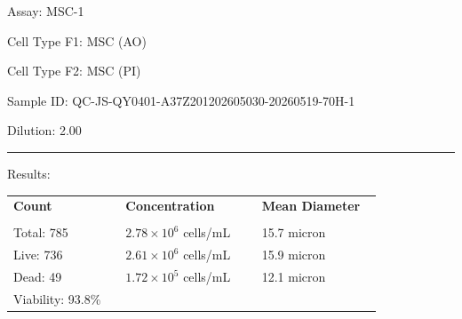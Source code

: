 \documentclass[UTF8,10pt,a4paper,fontset=fandol]{ctexart}
\newcommand{\fieldvalue}[1]{#1}
\begin{document}
\newpage

\noindent
Assay: \fieldvalue{MSC-1}

\medskip
Cell Type F1: \fieldvalue{MSC (AO)}

\noindent
Cell Type F2: \fieldvalue{MSC (PI)}

\medskip
Sample ID: \fieldvalue{QC-JS-QY0401-A37Z201202605030-20260519-70H-1}

\noindent
Dilution: \fieldvalue{2.00}

\bigskip
\noindent\rule{\linewidth}{0.4pt}

\noindent Results:

\medskip
\begin{tabular}{@{}p{0.28\linewidth}p{0.34\linewidth}p{0.30\linewidth}@{}}
\textbf{Count} & \textbf{Concentration} & \textbf{Mean Diameter} \\[-1mm]
\underline{\hspace{0.25\linewidth}} &
\underline{\hspace{0.30\linewidth}} &
\underline{\hspace{0.27\linewidth}} \\[1mm]

Total:
\fieldvalue{785}
&
\fieldvalue{$2.78 \times 10^{6}$ cells/mL}
&
\fieldvalue{15.7 micron}
\\

Live:
\fieldvalue{736}
&
\fieldvalue{$2.61 \times 10^{6}$ cells/mL}
&
\fieldvalue{15.9 micron}
\\

Dead:
\fieldvalue{49}
&
\fieldvalue{$1.72 \times 10^{5}$ cells/mL}
&
\fieldvalue{12.1 micron}
\\

Viability:
\fieldvalue{93.8\%}
&
&
\end{tabular}
\end{document}
